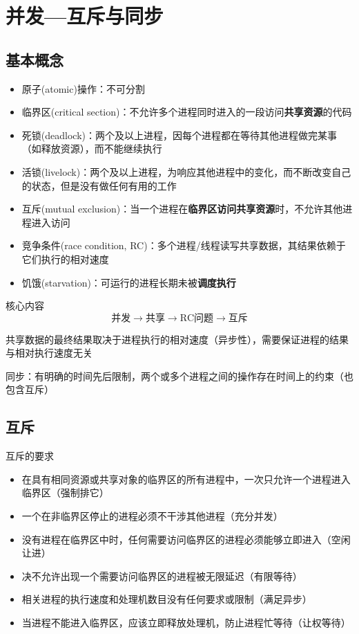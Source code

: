 
\section{并发---互斥与同步}
\subsection{基本概念}
\begin{itemize}
    \item 原子(atomic)操作：不可分割
    \item 临界区(critical section)：不允许多个进程同时进入的一段访问\textbf{共享资源}的代码
    \item 死锁(deadlock)：两个及以上进程，因每个进程都在等待其他进程做完某事（如释放资源），而不能继续执行
    \item 活锁(livelock)：两个及以上进程，为响应其他进程中的变化，而不断改变自己的状态，但是没有做任何有用的工作
    \item 互斥(mutual exclusion)：当一个进程在\textbf{临界区访问共享资源}时，不允许其他进程进入访问
    \item 竞争条件(race condition, RC)：多个进程/线程读写共享数据，其结果依赖于它们执行的相对速度
    \item 饥饿(starvation)：可运行的进程长期未被\textbf{调度执行}
\end{itemize}

核心内容
\[\text{并发}\to\text{共享}\to\text{RC问题}\to\text{互斥}\]

共享数据的最终结果取决于进程执行的相对速度（异步性），需要保证进程的结果与相对执行速度无关

同步：有明确的时间先后限制，两个或多个进程之间的操作存在时间上的约束（也包含互斥）

\subsection{互斥}
互斥的要求
\begin{itemize}
    \item 在具有相同资源或共享对象的临界区的所有进程中，一次只允许一个进程进入临界区（强制排它）
    \item 一个在非临界区停止的进程必须不干涉其他进程（充分并发）
    \item 没有进程在临界区中时，任何需要访问临界区的进程必须能够立即进入（空闲让进）
    \item 决不允许出现一个需要访问临界区的进程被无限延迟（有限等待）
    \item 相关进程的执行速度和处理机数目没有任何要求或限制（满足异步）
    \item 当进程不能进入临界区，应该立即释放处理机，防止进程忙等待（让权等待）
\end{itemize}

